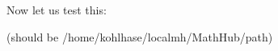 \documentclass[minimal]{omdoc}
\begin{document}
Now let us test this: \textsf{}\par
(should be \textsf{/home/kohlhase/localmh/MathHub/path})
\end{document}

